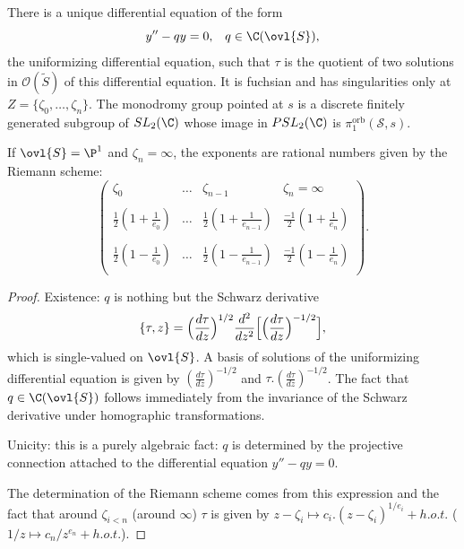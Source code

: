 \begin{pro}\label{pro::4.3.3} There is a unique differential equation of
 the form
 \begin{equation*}
  y''- qy=0,\;\;\; q\in \C(\ovl{S}),
 \end{equation*}
 the {\rm uniformizing differential equation}, such that $\tau$ is the
 quotient of two solutions in $\mathcal{O}(\tilde S)$ of this
 differential equation. It is fuchsian and has singularities only at
 $Z=\{\zeta_0,\ldots ,\zeta_n\}$.  The monodromy group pointed at $s$ is
 a discrete finitely generated subgroup of $SL_2(\C)$ whose image in
 $PSL_2(\C)$ is $\pi_1^{\mathrm{orb}}(\mathcal{S},s)$.

 \hfill\break If $\ovl{S}=\P^1$ and $\zeta_n=\infty$, the exponents are
 rational numbers given by the Riemann scheme:
 \begin{equation*}
  \begin{pmatrix}
   \zeta_0 & \ldots & \zeta_{n-1} & \zeta_n=\infty \\
   &&&\\
   \frac{1}{2}(1+\frac{1}{e_0})& \ldots &\frac{1}{2}(1+\frac{1}{e_{n-1}})&
   \frac{-1}{2}(1+\frac{1}{e_{n}}) \\
   \\
   \frac{1}{2}(1-\frac{1}{e_0})& \ldots &\frac{1}{2}(1-\frac{1}{e_{n-1}})&
   \frac{-1}{2}(1-\frac{1}{e_{n}}) \\
  \end{pmatrix}.
 \end{equation*}
\end{pro}

\begin{proof}
 Existence: $q$ is nothing but the Schwarz derivative
 \begin{equation*}
  \{\tau, z\}=
   \Bigl(\frac{d\tau}{dz}\Bigr)^{1/2}\frac{d^2}{dz^2}
   \Bigl[\Bigl(\frac{d\tau}{dz}\Bigr)^{-1/2}\Bigr],
 \end{equation*} 
 which is single-valued on $\ovl{S}$. A basis of solutions of the
 uniformizing differential equation is given by
 $(\frac{d\tau}{dz})^{-1/2}$ and $\tau.(\frac{d\tau}{dz})^{-1/2}$. The
 fact that $q\in \C(\ovl{S})$ follows immediately from the invariance of
 the Schwarz derivative under homographic transformations.

 Unicity: this is a purely algebraic fact: $q$ is determined by
 the projective connection attached to the differential equation $y''- qy=0$. 

 The determination of the Riemann scheme comes from this
 expression and the fact that around $\zeta_{i<n}$ (\resp around
 $\infty$) $\tau$ is given by $z-\zeta_i\mapsto c_i.(z-\zeta_i)^{1/e_i} +
 h.o.t.$ (\resp $1/z\mapsto c_n/z^{e_n} + h.o.t.$).
\end{proof}

